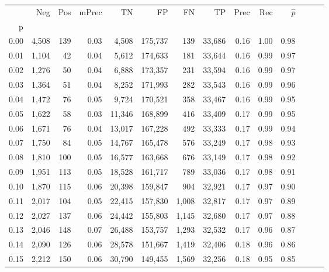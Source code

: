 \begin{tabular}{rrrrrrrrrrrrrr}
\toprule
{} &    Neg &    Pos & mPrec &       TN &       FP &      FN &      TP &  Prec &   Rec & $\hat{p}$ \\
p    &        &        &       &          &          &         &         &       &       &           \\
\midrule
0.00 &  4,508 &    139 &  0.03 &    4,508 &  175,737 &     139 &  33,686 &  0.16 &  1.00 &      0.98 \\
0.01 &  1,104 &     42 &  0.04 &    5,612 &  174,633 &     181 &  33,644 &  0.16 &  0.99 &      0.97 \\
0.02 &  1,276 &     50 &  0.04 &    6,888 &  173,357 &     231 &  33,594 &  0.16 &  0.99 &      0.97 \\
0.03 &  1,364 &     51 &  0.04 &    8,252 &  171,993 &     282 &  33,543 &  0.16 &  0.99 &      0.96 \\
0.04 &  1,472 &     76 &  0.05 &    9,724 &  170,521 &     358 &  33,467 &  0.16 &  0.99 &      0.95 \\
0.05 &  1,622 &     58 &  0.03 &   11,346 &  168,899 &     416 &  33,409 &  0.17 &  0.99 &      0.95 \\
0.06 &  1,671 &     76 &  0.04 &   13,017 &  167,228 &     492 &  33,333 &  0.17 &  0.99 &      0.94 \\
0.07 &  1,750 &     84 &  0.05 &   14,767 &  165,478 &     576 &  33,249 &  0.17 &  0.98 &      0.93 \\
0.08 &  1,810 &    100 &  0.05 &   16,577 &  163,668 &     676 &  33,149 &  0.17 &  0.98 &      0.92 \\
0.09 &  1,951 &    113 &  0.05 &   18,528 &  161,717 &     789 &  33,036 &  0.17 &  0.98 &      0.91 \\
0.10 &  1,870 &    115 &  0.06 &   20,398 &  159,847 &     904 &  32,921 &  0.17 &  0.97 &      0.90 \\
0.11 &  2,017 &    104 &  0.05 &   22,415 &  157,830 &   1,008 &  32,817 &  0.17 &  0.97 &      0.89 \\
0.12 &  2,027 &    137 &  0.06 &   24,442 &  155,803 &   1,145 &  32,680 &  0.17 &  0.97 &      0.88 \\
0.13 &  2,046 &    148 &  0.07 &   26,488 &  153,757 &   1,293 &  32,532 &  0.17 &  0.96 &      0.87 \\
0.14 &  2,090 &    126 &  0.06 &   28,578 &  151,667 &   1,419 &  32,406 &  0.18 &  0.96 &      0.86 \\
0.15 &  2,212 &    150 &  0.06 &   30,790 &  149,455 &   1,569 &  32,256 &  0.18 &  0.95 &      0.85 \\

\end{tabular}
